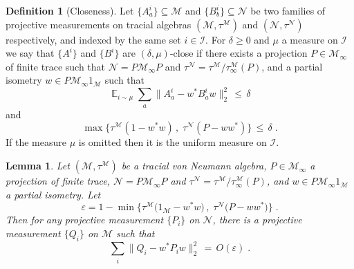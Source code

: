 \documentclass[11pt]{article}
\newtheorem{lemma}[theorem]{Lemma}
\theoremstyle{definition}
\newtheorem{definition}[theorem]{Definition}
\DeclareMathOperator*{\Expectation}{\mathbb{E}}
\newcommand{\Es}[1]{\Expectation_{#1}}
\newcommand{\mM}{\ensuremath{\mathcal{M}}}
\newcommand{\mI}{\ensuremath{\mathcal{I}}}
\newcommand{\eps}{\varepsilon}
\newcommand{\mN}{\mathcal{N}}
\begin{document}
	\begin{definition}[Closeness]\label{def:close}
Let $\{A^i_a\}\subseteq \mM$ and $\{B^i_b\}\subseteq \mN$ be two families of projective measurements on  tracial algebras $(\mM,\tau^\mM)$ and $(\mN,\tau^\mN)$ respectively, and indexed by the same set $i\in \mI$. For $\delta\geq0$ and $\mu$ a measure on $\mI$ we say that $\{A^i\}$ and $\{B^i\}$ are $(\delta,\mu)$-close if there exists a projection $P\in\mM_\infty$ of finite trace such that $\mN=P\mM_\infty P$ and $\tau^\mN=\tau^\mM/\tau^\mM_\infty(P)$, and a partial isometry $w\in P \mM_\infty 1_\mM$ such that 
\[ \Es{i\sim\mu} \sum_a \big\| A^i_a - w^* B^i_a w \big\|_2^2 \,\leq\,\delta\]
and 
\[\max\big\{ \tau^\mM(1-w^*w)\,,\; \tau^\mN(P-ww^*)\big\} \,\leq\, \delta\;.\]
If the measure $\mu$ is omitted then it is the uniform measure on $\mI$.
\end{definition}
	
\begin{lemma}\label{lem:pull-back}
Let  $(\mM,\tau^\mM)$ be a tracial von Neumann algebra, $P\in\mM_\infty$ a projection of finite trace, $\mN=P\mM_\infty P$ and $\tau^\mN=\tau^\mM/\tau^\mM_\infty(P)$, and $w\in P \mM_\infty 1_\mM$ a partial isometry. Let 
\[ \eps = 1-\min\big\{ \tau^\mM\big(1_\mM - w^* w\big)\,,\;\tau^\mN\big( P- w w^*\big)\big\}\;.\]
 Then for any projective measurement $\{P_i\}$ on $\mN$, there is a projective measurement $\{Q_i\}$ on $\mM$ such that 
\[ \sum_i \big\| Q_i - w^* P_i w\big\|_2^2 \,=\, O(\eps)\;.\] 
\end{lemma}	
\end{document}
